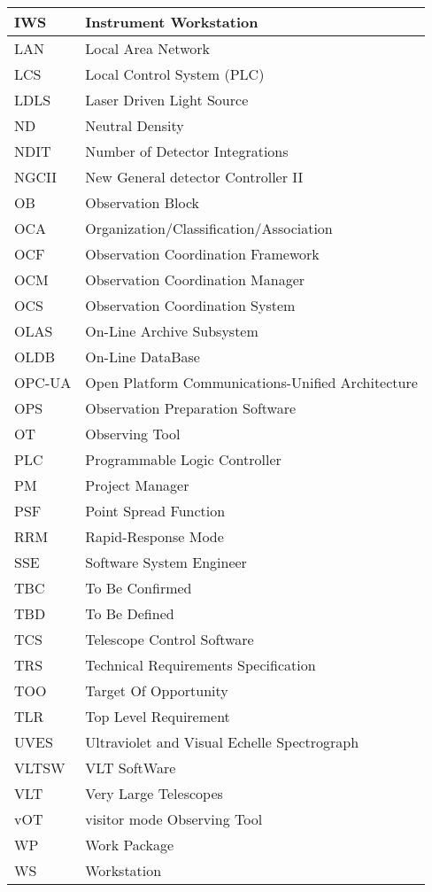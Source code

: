 \begin{longtable}{ |l|l| }
IWS & Instrument Workstation \\ \hline
LAN & Local Area Network \\ \hline
LCS & Local Control System (PLC) \\ \hline
LDLS & Laser Driven Light Source \\ \hline
ND & Neutral Density \\ \hline
NDIT & Number of Detector Integrations \\ \hline
NGCII & New General detector Controller II \\ \hline
OB & Observation Block \\ \hline
OCA & Organization/Classification/Association \\ \hline
OCF & Observation Coordination Framework \\ \hline
OCM & Observation Coordination Manager \\ \hline
OCS & Observation Coordination System \\ \hline
OLAS & On-Line Archive Subsystem \\ \hline
OLDB & On-Line DataBase \\ \hline
OPC-UA & Open Platform Communications-Unified Architecture \\ \hline
OPS & Observation Preparation Software \\ \hline
OT & Observing Tool \\ \hline
PLC & Programmable Logic Controller \\ \hline
PM & Project Manager \\ \hline
PSF & Point Spread Function \\ \hline
RRM & Rapid-Response Mode \\ \hline
SSE & Software System Engineer \\ \hline
TBC & To Be Confirmed \\ \hline
TBD & To Be Defined \\ \hline
TCS & Telescope Control Software \\ \hline
TRS & Technical Requirements Specification \\ \hline
TOO & Target Of Opportunity \\ \hline
TLR & Top Level Requirement \\ \hline
UVES & Ultraviolet and Visual Echelle Spectrograph \\ \hline
VLTSW & VLT SoftWare \\ \hline
VLT & Very Large Telescopes \\ \hline
vOT & visitor mode Observing Tool \\ \hline
WP & Work Package \\ \hline
WS & Workstation \\ \hline
\end{longtable}

\renewcommand\thetable{1} %
